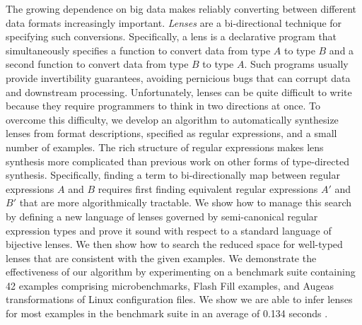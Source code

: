 The growing dependence on big data makes reliably converting
between different data formats increasingly important.
\emph{Lenses} are a bi-directional technique for specifying such
conversions.  Specifically, a lens is a declarative program that
simultaneously specifies a function to convert data from type $A$ to
type $B$ and a second function to convert data from type $B$ to type
$A$.  Such programs usually provide invertibility guarantees, avoiding
pernicious bugs that can corrupt data and downstream processing.
Unfortunately, lenses can be quite difficult to write because they
require programmers to think in two directions at once.  To overcome
this difficulty, we develop an algorithm to automatically synthesize
lenses from format descriptions, specified as regular expressions, and
a small number of examples.  The rich structure of regular expressions
makes lens synthesis more complicated than previous work on other
forms of type-directed synthesis.  Specifically, finding a term to
bi-directionally map between regular expressions $A$ and $B$ requires
first finding equivalent regular expressions $A'$ and $B'$ that are
more algorithmically tractable.
We show how to manage this search by defining a new language of
lenses governed by semi-canonical regular expression types and prove it
sound with respect to a standard language of bijective lenses.  
We then show
how to search the reduced space for well-typed lenses that are consistent
with the given examples.  We demonstrate the effectiveness of our algorithm
by experimenting on a benchmark suite containing 42 examples
comprising microbenchmarks, Flash Fill
examples, and Augeas transformations of Linux configuration files.
We show we are able to infer lenses for most\bcp{!} examples in the
benchmark suite in an average of 0.134 seconds . 




